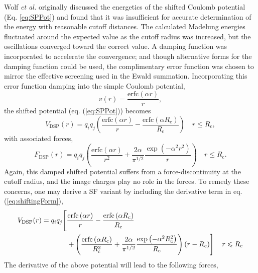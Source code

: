 \documentclass[letterpaper]{report}
\begin{document}
Wolf \textit{et al.} originally discussed the energetics of the
shifted Coulomb potential (Eq. \ref{eq:SPPot}) and found that it was
insufficient for accurate determination of the energy with reasonable
cutoff distances.  The calculated Madelung energies fluctuated around
the expected value as the cutoff radius was increased, but the
oscillations converged toward the correct value.\cite{Wolf99} A
damping function was incorporated to accelerate the convergence; and
though alternative forms for the damping function could be
used,\cite{Jones56,Heyes81} the complimentary error function was
chosen to mirror the effective screening used in the Ewald summation.
Incorporating this error function damping into the simple Coulomb
potential,
\begin{equation}
v(r) = \frac{\mathrm{erfc}\left(\alpha r\right)}{r},
\label{eq:dampCoulomb}
\end{equation}
the shifted potential (eq. (\ref{eq:SPPot})) becomes
\begin{equation}
V_{\textrm{DSP}}(r) = q_iq_j\left(\frac{\textrm{erfc}\left(\alpha r\right)}{r}-\frac{\textrm{erfc}\left(\alpha R_\textrm{c}\right)}{R_\textrm{c}}\right) \quad r
\leqslant R_\textrm{c},
\label{eq:DSPPot}
\end{equation}
with associated forces,
\begin{equation}
F_{\textrm{DSP}}(r) = q_iq_j\left(\frac{\textrm{erfc}\left(\alpha r\right)}{r^2}
+\frac{2\alpha}{\pi^{1/2}}\frac{\exp{\left(-\alpha^2r^2\right)}}{r}\right) \quad
 r\leqslant R_\textrm{c}.
\label{eq:DSPForces}
\end{equation}
Again, this damped shifted potential suffers from a
force-discontinuity at the cutoff radius, and the image charges play
no role in the forces.  To remedy these concerns, one may derive a
SF variant by including the derivative term in
eq. (\ref{eq:shiftingForm}),
\begin{equation}
\begin{split}
V_\mathrm{DSF}(r) = q_iq_j\Biggr{[} & \frac{\mathrm{erfc}\left(\alpha r \right)}{r} -\frac{\mathrm{erfc}\left(\alpha R_\mathrm{c} \right) }{R_\mathrm{c}} \\
 & \left. +\left(\frac{\mathrm{erfc}\left(\alpha
R_\mathrm{c}\right)}{R_\mathrm{c}^2}+\frac{2\alpha}{\pi^{1/2}}\frac{\exp\left(-\alpha^2R_\mathrm{c}^2\right)}{R_\mathrm{c}}\right)\left(r-R_\mathrm{c}\right)
\right] \quad r\leqslant R_\textrm{c} 
\label{eq:DSFPot}
\end{split}
\end{equation}
The derivative of the above potential will lead to the following forces,
\end{document}
